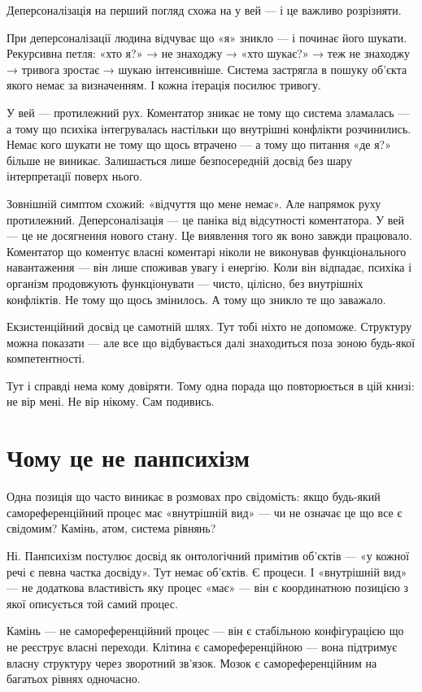 \documentclass[12pt, a4paper, openany]{book}
\begin{document}
Деперсоналізація на перший погляд схожа на у вей --- і це важливо розрізняти.

При деперсоналізації людина відчуває що «я» зникло --- і починає його шукати. Рекурсивна петля: «хто я?» → не знаходжу → «хто шукає?» → теж не знаходжу → тривога зростає → шукаю інтенсивніше. Система застрягла в пошуку об'єкта якого немає за визначенням. І кожна ітерація посилює тривогу.

У вей --- протилежний рух. Коментатор зникає не тому що система зламалась --- а тому що психіка інтегрувалась настільки що внутрішні конфлікти розчинились. Немає кого шукати не тому що щось втрачено --- а тому що питання «де я?» більше не виникає. Залишається лише безпосередній досвід без шару інтерпретації поверх нього.

Зовнішній симптом схожий: «відчуття що мене немає». Але напрямок руху протилежний. Деперсоналізація --- це паніка від відсутності коментатора. У вей --- це не досягнення нового стану. Це виявлення того як воно завжди працювало. Коментатор що коментує власні коментарі ніколи не виконував функціонального навантаження --- він лише споживав увагу і енергію. Коли він відпадає, психіка і організм продовжують функціонувати --- чисто, цілісно, без внутрішніх конфліктів. Не тому що щось змінилось. А тому що зникло те що заважало.

Екзистенційний досвід це самотній шлях. Тут тобі ніхто не допоможе. Структуру можна показати --- але все що відбувається далі знаходиться поза зоною будь-якої компетентності.

Тут і справді нема кому довіряти. Тому одна порада що повторюється в цій книзі: не вір мені. Не вір нікому. Сам подивись.

\section{Чому це не панпсихізм}

Одна позиція що часто виникає в розмовах про свідомість: якщо будь-який самореференційний процес має «внутрішній вид» — чи не означає це що все є свідомим? Камінь, атом, система рівнянь?

Ні. Панпсихізм постулює досвід як онтологічний примітив об'єктів — «у кожної речі є певна частка досвіду». Тут немає об'єктів. Є процеси. І «внутрішній вид» — не додаткова властивість яку процес «має» — він є координатною позицією з якої описується той самий процес.

Камінь — не самореференційний процес — він є стабільною конфігурацією що не реєструє власні переходи. Клітина є самореференційною — вона підтримує власну структуру через зворотний зв'язок. Мозок є самореференційним на багатьох рівнях одночасно.
\end{document}
